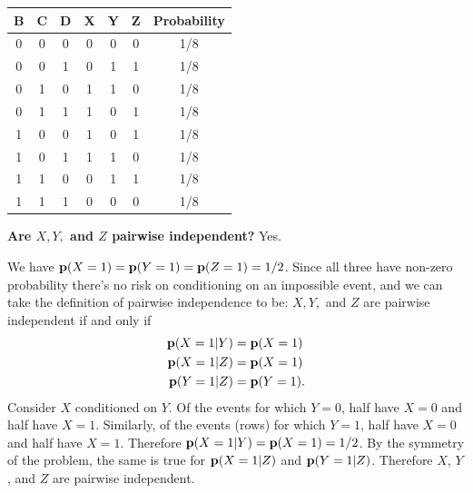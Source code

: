 \begin{enumerate}[label=(\alph*)]
    \begin{mdframed}

      \begin{tabular}{c|c|c|c|c|c|c}
        B & C & D & X & Y & Z & Probability\\
        \hline
        0 & 0 & 0 & 0 & 0 & 0 & 1/8 \\
        0 & 0 & 1 & 0 & 1 & 1 & 1/8 \\
        0 & 1 & 0 & 1 & 1 & 0 & 1/8 \\
        0 & 1 & 1 & 1 & 0 & 1 & 1/8 \\
        1 & 0 & 0 & 1 & 0 & 1 & 1/8 \\
        1 & 0 & 1 & 1 & 1 & 0 & 1/8 \\
        1 & 1 & 0 & 0 & 1 & 1 & 1/8 \\
        1 & 1 & 1 & 0 & 0 & 0 & 1/8 \\
      \end{tabular}
    \end{mdframed}

    \begin{mdframed}
      \textbf{Are $X, Y,$ and $Z$ pairwise independent?} Yes.

      We have $\mathbf{p}(X=1) = \mathbf{p}(Y=1) = \mathbf{p}(Z=1) = 1/2$. Since all three have
      non-zero probability there's no risk on conditioning on an impossible
      event, and we can take the definition of pairwise independence to be:
      $X, Y,$ and $Z$ are pairwise independent if and only if
      \begin{align*}
        \mathbf{p}(X=1|Y) &= \mathbf{p}(X=1)\\
        \mathbf{p}(X=1|Z) &= \mathbf{p}(X=1)\\
        \mathbf{p}(Y=1|Z) &= \mathbf{p}(Y=1).
      \end{align*}
      Consider $X$ conditioned on $Y$. Of the events for which $Y=0$, half have
      $X=0$ and half have $X=1$. Similarly, of the events (rows) for which
      $Y=1$, half have $X=0$ and half have $X=1$. Therefore
      $\mathbf{p}(X=1|Y) = \mathbf{p}(X=1) = 1/2$. By the symmetry of the problem, the same is
      true for $\mathbf{p}(X=1|Z)$ and $\mathbf{p}(Y=1|Z)$. Therefore $X$, $Y$, and $Z$ are
      pairwise independent.
    \end{mdframed}


\end{enumerate}
